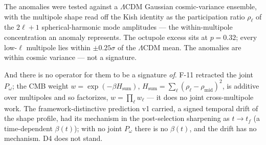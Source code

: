 \documentclass[11pt,a4paper]{article}
\newcommand{\Pomega}{P_{\omega}}
\begin{document}
The anomalies were tested against a $\Lambda$CDM Gaussian cosmic-variance ensemble, with the multipole shape read off the Kish identity as the participation ratio $\rho_\ell$ of the $2\ell+1$ spherical-harmonic mode amplitudes --- the within-multipole concentration an anomaly represents. The octupole excess sits at $p = 0.32$; every low-$\ell$ multipole lies within $\pm 0.25\sigma$ of the $\Lambda$CDM mean. The anomalies are within cosmic variance --- not a signature.

And there is no operator for them to be a signature \emph{of}. F-11 retracted the joint $\Pomega$; the CMB weight $w = \exp(-\beta H_{\text{sum}})$, $H_{\text{sum}} = \sum_\ell (\rho_\ell - \rho_{\text{mid}})^2$, is additive over multipoles and so factorizes, $w = \prod_\ell w_\ell$ --- it does no joint cross-multipole work. The framework-distinctive prediction v1 carried, a signed temporal drift of the shape profile, had its mechanism in the post-selection sharpening as $t \to t_f$ (a time-dependent $\beta(t)$); with no joint $\Pomega$ there is no $\beta(t)$, and the drift has no mechanism. D4 does not stand.
\end{document}
